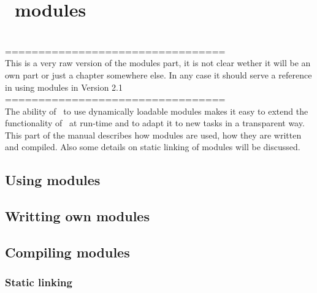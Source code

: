 
\part{\GLOBES\ modules}
\label{part:3}
~\\
=================================\\
This is a very raw version of the modules part, it is not clear
wether it will be an own part or just a chapter somewhere else.
In any case it should serve a reference in using modules in
Version 2.1\\
=================================\\


The ability of \GLOBES\ to use dynamically loadable modules makes it easy
to extend the functionality of \GLOBES\ at run-time and to adapt it to
new tasks in a transparent way. This part of the manual describes how 
modules are used, how they are written and compiled. Also some details
on static linking of modules will be discussed.

\chapter{Using modules}
\label{chap:using_modules}

\chapter{Writting own modules}
\label{chap:own_modules}        

\chapter{Compiling modules}
\label{chap:comp_modules}

\section{Static linking}
\label{sec:static_modules}